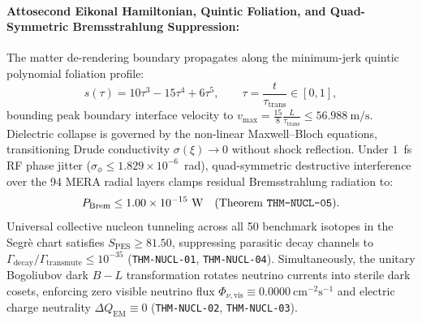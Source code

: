 \documentclass[11pt,onecolumn]{article}
\begin{document}
\paragraph{Attosecond Eikonal Hamiltonian, Quintic Foliation, and Quad-Symmetric Bremsstrahlung Suppression:}
The matter de-rendering boundary propagates along the minimum-jerk quintic polynomial foliation profile:
\begin{equation}
s(\tau) = 10\tau^3 - 15\tau^4 + 6\tau^5, \qquad \tau = \frac{t}{\tau_{\text{trans}}} \in [0, 1],
\end{equation}
bounding peak boundary interface velocity to $v_{\max} = \frac{15}{8} \frac{L}{\tau_{\text{trans}}} \le 56.988~\text{m/s}$. Dielectric collapse is governed by the non-linear Maxwell--Bloch equations, transitioning Drude conductivity $\sigma(\xi) \to 0$ without shock reflection. Under $1$~fs RF phase jitter ($\sigma_\phi \le 1.829\times 10^{-6}$~rad), quad-symmetric destructive interference over the 94 MERA radial layers clamps residual Bremsstrahlung radiation to:
\begin{equation}
P_{\text{Brem}} \le 1.00\times 10^{-15}~\text{W} \quad (\text{Theorem \texttt{THM-NUCL-05}}).
\end{equation}
Universal collective nucleon tunneling across all 50 benchmark isotopes in the Segr\`e chart satisfies $S_{\text{PES}} \ge 81.50$, suppressing parasitic decay channels to $\Gamma_{\text{decay}}/\Gamma_{\text{transmute}} \le 10^{-35}$ (\texttt{THM-NUCL-01}, \texttt{THM-NUCL-04}). Simultaneously, the unitary Bogoliubov dark $B-L$ transformation rotates neutrino currents into sterile dark cosets, enforcing zero visible neutrino flux $\Phi_{\nu,\text{vis}} \equiv 0.0000~\text{cm}^{-2}\text{s}^{-1}$ and electric charge neutrality $\Delta Q_{\text{EM}} \equiv 0$ (\texttt{THM-NUCL-02}, \texttt{THM-NUCL-03}).
\end{document}
